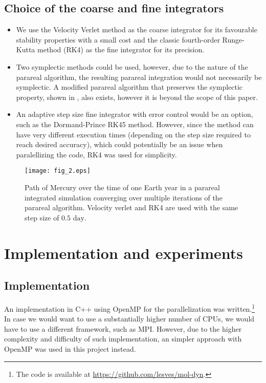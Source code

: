 \documentclass[conference]{IEEEtran}
\begin{document}
\subsection{Choice of the coarse and fine integrators}
\begin{itemize}
    \item We use the Velocity Verlet method as the coarse integrator for its favourable stability properties with a small cost and the classic fourth-order Runge-Kutta method (RK4) as the fine integrator for its precision. 
    \item Two symplectic methods could be used, however, due to the nature of the parareal algorithm, the resulting parareal integration would not necessarily be symplectic. A modified parareal algorithm that preserves the symplectic property, shown in \cite{symplecticparareal}, also exists, however it is beyond the scope of this paper.
    \item An adaptive step size fine integrator with error control would be an option, such as the Dormand-Prince RK45 method. However, since the method can have very different execution times (depending on the step size required to reach desired accuracy), which could potentially be an issue when paralellizing the code, RK4 was used for simplicity.
\end{itemize}

\begin{figure}[htbp]
\centerline{\texttt{[image: fig\_2.eps]}}
\caption{Path of Mercury over the time of one Earth year in a parareal integrated simulation converging over multiple iterations of the parareal algorithm. Velocity verlet and RK4 are used with the same step size of $0.5\text{ day}$.}
\label{mercury}
\end{figure}

\section{Implementation and experiments}

\subsection{Implementation}
An implementation in C++ using OpenMP for the parallelization was written.\footnote{The code is available at \url{https://github.com/lesves/mol-dyn}.} In case we would want to use a substantially higher number of CPUs, we would have to use a different framework, such as MPI. However, due to the higher complexity and difficulty of such  implementation, an simpler approach with OpenMP was used in this project instead.
\end{document}
